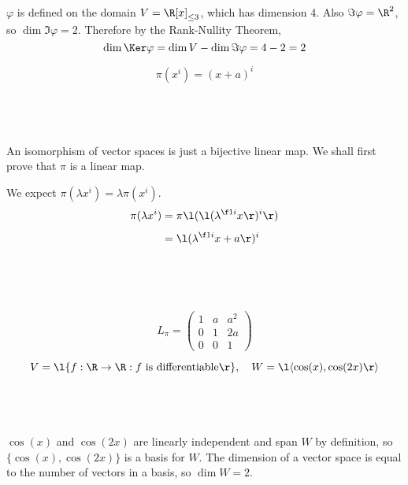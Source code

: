 \documentclass[a4paper]{article}
\begin{document}
$\varphi$ is defined on the domain $V = \R[x]_{\le 3}$, which has dimension 4. Also $\Im \varphi = \R^2$, so $\dim \Im \varphi = 2$. Therefore by the Rank-Nullity Theorem, $$\dim \Ker \varphi = \dim V - \dim \Im \varphi = 4 - 2 = 2$$



$$\pi(x^i) = (x+a)^i$$

\subsection{~}

An isomorphism of vector spaces is just a bijective linear map. We shall first prove that $\pi$ is a linear map.

We expect $\pi(\lambda x^i) = \lambda \pi(x^i)$. \begin{align*}
\pi(\lambda x^i) &= \pi\l( \l( \lambda^{\f1i} x \r)^i \r)\\[1ex]
&= \l( \lambda^{\f1i} x + a \r)^i\\[1ex]
\end{align*}


\subsection{~}

$$L_\pi = \begin{pmatrix} 1 & a & a^2\\ 0 & 1 & 2a \\ 0 & 0 & 1 \end{pmatrix}$$



$$V = \l\{ f : \R \to \R : f \text{ is differentiable} \r\}, \quad W = \l\langle \cos(x), \cos(2x) \r\rangle$$

\subsection{~}

$\cos(x)$ and $\cos(2x)$ are linearly independent and span $W$ by definition, so $\{\cos(x), \cos(2x)\}$ is a basis for $W$. The dimension of a vector space is equal to the number of vectors in a basis, so $\dim W = 2$.

\subsection{~}
\end{document}
